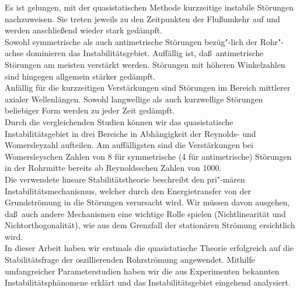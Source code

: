 \documentclass[10pt,a5paper,oneside,draft]{book}
\numberwithin{equation}{chapter}
\begin{document}
Es ist gelungen, mit der quasistatischen Methode kurzzeitige instabile St\"orungen nachzuweisen.
Sie treten jeweils zu den Zeitpunkten der Flu\ss umkehr auf und werden anschlie\ss end wieder stark ged\"ampft.\\
Sowohl symmetrische als auch antimetrische St\"orungen bez\"ug"-lich der Rohr"-achse dominieren das Instabilit\"atsgebiet.
Auff\"allig ist, da\ss\ antimetrische St\"orungen am meisten verst\"arkt werden.
St\"orungen mit h\"oheren Winkelzahlen sind hingegen allgemein st\"arker ged\"ampft.\\
Anf\"allig f\"ur die kurzzeitigen Verst\"arkungen sind St\"orungen im Bereich mittlerer axialer Wellenl\"angen.
Sowohl langwellige als auch kurzwellige St\"orungen beliebiger Form werden zu jeder Zeit ged\"ampft.\\
Durch die vergleichenden Studien k\"onnen wir das quasistatische Instabilit\"atsgebiet in drei Bereiche in Abh\"angigkeit der Reynolds- und Womersleyzahl aufteilen.
Am auff\"alligsten sind die Verst\"arkungen bei Womersleyschen Zahlen von 8 f\"ur symmetrische (4 f\"ur antimetrische) St\"orungen in der Rohrmitte bereits ab Reynoldsschen Zahlen von 1000.\\

Die verwendete lineare Stabilit\"atstheorie beschreibt den pri"-m\"aren Instabilit\"atsmechanismus, welcher durch den Energietransfer von der Grundstr\"omung in die St\"orungen verursacht wird.
Wir m\"ussen davon ausgehen, da\ss\ auch andere Mechanismen eine wichtige Rolle spielen (Nichtlinearit\"at und Nichtorthogonalit\"at), wie aus dem Grenzfall der station\"aren Str\"omung ersichtlich wird.\\


In dieser Arbeit haben wir erstmals die quasistatische Theorie erfolgreich auf die Stabilit\"atsfrage der oszillierenden Rohrstr\"omung angewendet.
Mithilfe umfangreicher Parameterstudien haben wir die aus Experimenten bekannten Instabilit\"atsph\"anomene erkl\"art und das Instabilit\"atsgebiet eingehend analysiert.
\end{document}
